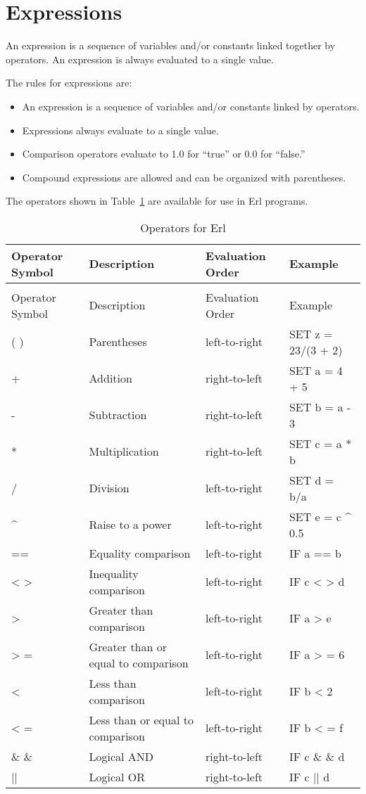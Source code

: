 \section{Expressions}\label{expressions}

An expression is a sequence of variables and/or constants linked together by operators. An expression is always evaluated to a single value.

The rules for expressions are:

\begin{itemize}
\item
  An expression is a sequence of variables and/or constants linked by operators.
\item
  Expressions always evaluate to a single value.
\item
  Comparison operators evaluate to 1.0 for ``true'' or 0.0 for ``false.''
\item
  Compound expressions are allowed and can be organized with parentheses.
\end{itemize}

The operators shown in Table~\ref{table:operators-for-erl} are available for use in Erl programs.

\begin{longtable}[c]{p{1.5in}p{1.5in}p{1.5in}p{1.5in}}
\caption{Operators for Erl \label{table:operators-for-erl}} \tabularnewline
\toprule 
Operator Symbol & Description & Evaluation Order & Example \tabularnewline
\midrule
\endfirsthead

\caption[]{Operators for Erl} \tabularnewline
\toprule 
Operator Symbol & Description & Evaluation Order & Example \tabularnewline
\midrule
\endhead

( ) & Parentheses & left-to-right & SET z = 23/(3 + 2) \tabularnewline
+ & Addition & right-to-left & SET a = 4 + 5 \tabularnewline
- & Subtraction & right-to-left & SET b = a - 3 \tabularnewline
* & Multiplication & right-to-left & SET c = a * b \tabularnewline
/ & Division & left-to-right & SET d = b/a \tabularnewline
\^{} & Raise to a power & left-to-right & SET e = c \^{} 0.5 \tabularnewline
== & Equality comparison & left-to-right & IF a == b \tabularnewline
< > ~ & Inequality comparison & left-to-right & IF c  < >  d \tabularnewline
> ~ & Greater than comparison & left-to-right & IF a  >  e \tabularnewline
> = & Greater than or equal to comparison & left-to-right & IF a  > = 6 \tabularnewline
< ~ & Less than comparison & left-to-right & IF b  <  2 \tabularnewline
< = & Less than or equal to comparison & left-to-right & IF b  < = f \tabularnewline
\& \& & Logical AND & right-to-left & IF c  \& \&  d \tabularnewline
|| & Logical OR & right-to-left & IF c || d \tabularnewline
\bottomrule
\end{longtable}

